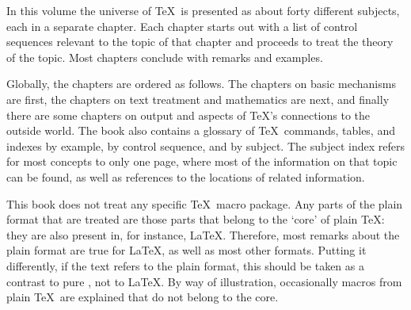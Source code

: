\documentclass[twoside,letterpaper,openright]{rapport3}
\begin{document}
In this volume the universe of \TeX\ is presented as
about forty different subjects, each in a separate
chapter.
Each chapter starts out with a list of control sequences
relevant to the topic of that chapter
and proceeds to treat the 
theory of the topic. 
Most chapters conclude with remarks and examples.

Globally, the chapters are ordered as follows. 
The chapters on basic mechanisms are first,
the chapters on text treatment and mathematics are next,
and finally there are some
chapters on output and aspects of \TeX's connections to
the outside world.
%
The book also contains a glossary of \TeX\
commands, tables,
and indexes by example, by control sequence, and by subject.
The subject index refers for most concepts to
only one page, where most of the information
on that topic can be found, as well as references
to the locations of related information.

This book does not treat any specific \TeX\ macro package.
Any parts of the plain format that are treated are those
parts that belong to the `core' of plain \TeX: they
are also present in, for instance, \LaTeX.
Therefore, most remarks about the plain format
are true for \LaTeX, as well as most other formats.
Putting it differently,
if the text refers to the plain format, this should be taken
as a contrast to pure \IniTeX, not to \LaTeX.
By way of illustration, occasionally macros from plain \TeX\
are explained that do not belong to the core.
\end{document}
